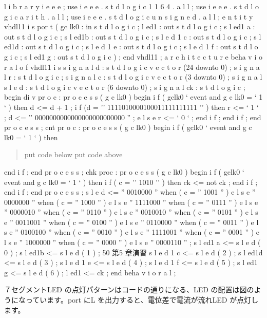 \documentclass[letterpaper,10pt,dvipdfmx]{sphinxmanual}
\begin{document}
l i b r a r y i e e e ;
use i e e e . s t d l o g i c 1 1 6 4 . a l l ;
use i e e e . s t d l o g i c a r i t h . a l l ;
use i e e e . s t d l o g i c u n s i g n e d . a l l ;
e n t i t y vhdl11 i s
por t (
gc lk0 : in s t d l o g i c ;
l ed1 : out s t d l o g i c ;
s l ed1 a : out s t d l o g i c ;
s l ed1b : out s t d l o g i c ;
s l e d 1 c : out s t d l o g i c ;
s l ed1d : out s t d l o g i c ;
s l e d 1 e : out s t d l o g i c ;
s l e d 1 f : out s t d l o g i c ;
s l ed1 g : out s t d l o g i c
) ;
end vhdl11 ;
a r c h i t e c t u r e beha v i o r a l o f vhdl11 i s
s i g n a l d : s t d l o g i c v e c t o r (24 downto 0) ;
s i g n a l r : s t d l o g i c ;
s i g n a l c : s t d l o g i c v e c t o r (3 downto 0) ;
s i g n a l s l e d : s t d l o g i c v e c t o r (6 downto 0) ;
s i g n a l ck : s t d l o g i c ;
begin
di v pr o c : pr o c e s s ( g c lk0 )
begin
i f ( gclk0 ` event and g c lk0 = ` 1 ` ) then
d \textless{}= d + 1 ;
i f (d = '' 1111010000100011111111111 '' ) then
r \textless{}= ` 1 ` ;
d \textless{}= '' 0000000000000000000000000 '' ;
e l s e
r \textless{}= ` 0 ` ;
end i f ;
end i f ;
end pr o c e s s ;
cnt pr o c : pr o c e s s ( g c lk0 )
begin
i f ( gclk0 ` event and g c lk0 = ` 1 ` ) then
\begin{quote}

put code below
put code above
\end{quote}

end i f ;
end pr o c e s s ;
chk proc : pr o c e s s ( g c lk0 )
begin
i f ( gclk0 ` event and g c lk0 = ` 1 ` ) then
i f ( c = '' 1010 '' ) then
ck \textless{}= not ck ;
end i f ;
end i f ;
end pr o c e s s ;
s l e d \textless{}= '' 0010000 '' when ( c = '' 1001 '' )
e l s e '' 0000000 '' when ( c = '' 1000 '' )
e l s e '' 1111000 '' when ( c = '' 0111 '' )
e l s e '' 0000010 '' when ( c = '' 0110 '' )
e l s e '' 0010010 '' when ( c = '' 0101 '' )
e l s e '' 0011001 '' when ( c = '' 0100 '' )
e l s e '' 0110000 '' when ( c = '' 0011 '' )
e l s e '' 0100100 '' when ( c = '' 0010 '' )
e l s e '' 1111001 '' when ( c = '' 0001 '' )
e l s e '' 1000000 '' when ( c = '' 0000 '' )
e l s e '' 0000110 '' ;
s l ed1 a \textless{}= s l e d ( 0 ) ;
s l ed1b \textless{}= s l e d ( 1 ) ;
50 第5 章演習
s l e d 1 c \textless{}= s l e d ( 2 ) ;
s l ed1d \textless{}= s l e d ( 3 ) ;
s l e d 1 e \textless{}= s l e d ( 4 ) ;
s l e d 1 f \textless{}= s l e d ( 5 ) ;
s l ed1 g \textless{}= s l e d ( 6 ) ;
l ed1 \textless{}= ck ;
end beha v i o r a l ;

７セグメントLED の点灯パターンはコードの通りになる、LED の配置は図のようになっています。port にL を出力すると、電位差で電流が流れLED が点灯します。
\end{document}

